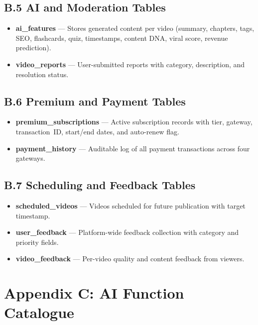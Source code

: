 \subsection*{B.5 AI and Moderation Tables}
\enlargethispage{3\baselineskip}
\begin{itemize}[noitemsep]
  \item \textbf{ai\_features} --- Stores generated content per video (summary, chapters, tags, SEO, flashcards, quiz, timestamps, content DNA, viral score, revenue prediction).
  \item \textbf{video\_reports} --- User-submitted reports with category, description, and resolution status.
\end{itemize}

\subsection*{B.6 Premium and Payment Tables}
\begin{itemize}[noitemsep]
  \item \textbf{premium\_subscriptions} --- Active subscription records with tier, gateway, transaction~ID, start/end dates, and auto-renew flag.
  \item \textbf{payment\_history} --- Auditable log of all payment transactions across four gateways.
\end{itemize}

\subsection*{B.7 Scheduling and Feedback Tables}
\begin{itemize}[noitemsep]
  \item \textbf{scheduled\_videos} --- Videos scheduled for future publication with target timestamp.
  \item \textbf{user\_feedback} --- Platform-wide feedback collection with category and priority fields.
  \item \textbf{video\_feedback} --- Per-video quality and content feedback from viewers.
\end{itemize}
\nopagebreak[4]


\newpage
\section*{Appendix C: AI Function Catalogue}
\label{app:ai-functions}

